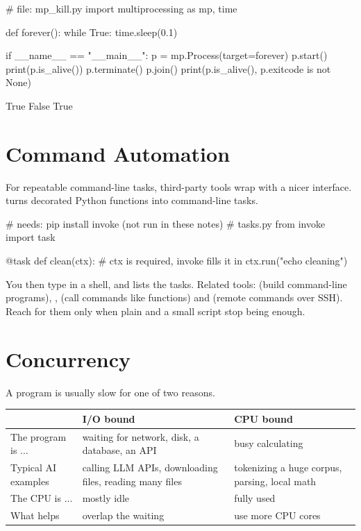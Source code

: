 \begin{pycode}
# file: mp_kill.py
import multiprocessing as mp, time


def forever():
    while True:
        time.sleep(0.1)


if __name__ == "__main__":
    p = mp.Process(target=forever)
    p.start()
    print(p.is_alive())
    p.terminate()
    p.join()
    print(p.is_alive(), p.exitcode is not None)
\end{pycode}
\begin{rawcode}
True
False True
\end{rawcode}

\section{Command Automation}

For repeatable command-line tasks, third-party tools wrap  with a nicer
interface.  turns decorated Python functions into command-line tasks.

\begin{pycode}
# needs: pip install invoke   (not run in these notes)
# tasks.py
from invoke import task

@task
def clean(ctx):               # ctx is required, invoke fills it in
    ctx.run("echo cleaning")
\end{pycode}

You then type  in a shell, and  lists the tasks. Related
tools:  (build command-line programs), ,  (call commands like
functions) and  (remote commands over SSH). Reach for them only when plain
 and a small script stop being enough.

\section{Concurrency}

A program is usually slow for one of two reasons.

\begin{center}
\begin{tabularx}{\linewidth}{@{}l X X@{}}
\toprule
 & \textbf{I/O bound} & \textbf{CPU bound} \\
\midrule
The program is ... & waiting for network, disk, a database, an API & busy calculating \\
Typical AI examples & calling LLM APIs, downloading files, reading many files & tokenizing a huge corpus, parsing, local math \\
The CPU is ... & mostly idle & fully used \\
What helps & overlap the waiting & use more CPU cores \\
\bottomrule
\end{tabularx}
\end{center}

